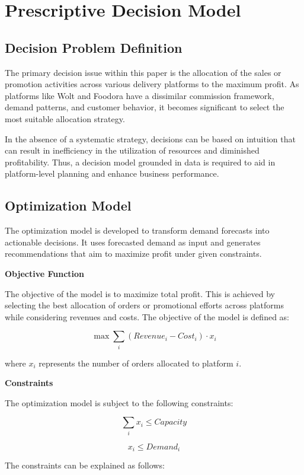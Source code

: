 \section{Prescriptive Decision Model}

\subsection{Decision Problem Definition}

The primary decision issue within this paper is the allocation of the sales or promotion activities across various delivery platforms to the maximum profit. As platforms like Wolt and Foodora have a dissimilar commission framework, demand patterns, and customer behavior, it becomes significant to select the most suitable allocation strategy. 

In the absence of a systematic strategy, decisions can be based on intuition that can result in inefficiency in the utilization of resources and diminished profitability. Thus, a decision model grounded in data is required to aid in platform-level planning and enhance business performance.


\subsection{Optimization Model}

The optimization model is developed to transform demand forecasts into actionable decisions. It uses forecasted demand as input and generates recommendations that aim to maximize profit under given constraints.

\textbf{Objective Function}

The objective of the model is to maximize total profit. This is achieved by selecting the best allocation of orders or promotional efforts across platforms while considering revenues and costs. The objective of the model is defined as:

\[
\max \sum_{i} (Revenue_i - Cost_i) \cdot x_i
\]

where \(x_i\) represents the number of orders allocated to platform \(i\).


\textbf{Constraints}

The optimization model is subject to the following constraints:

\[
\sum_i x_i \leq Capacity
\]

\[
x_i \leq Demand_i
\]

The constraints can be explained as follows:

